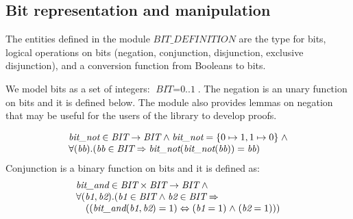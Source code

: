 \documentclass[a4paper]{llncs}
\begin{document}
\subsection{Bit representation and manipulation}
\label{subsec:HardwareLibrary1}

The entities defined in the module $\textit{BIT\_DEFINITION}$ are the
type for bits, logical operations on bits (negation, conjunction,
disjunction, exclusive disjunction), and a conversion function from
Booleans to bits.

We model bits as a set of integers: $\textit{BIT} =
\textit{0..1}$. The negation is an unary function on bits and it is
defined below. The module also provides lemmas on negation that may be useful for the
users of the library to develop proofs.

$$
\begin{array}{l}
\textit{bit\_not}  \in  \textit{BIT}  \fun  \textit{BIT}  \land 
\textit{bit\_not} \rm = \rm \{ \rm 0  \mapsto  \rm 1 , \rm 1  \mapsto  \rm 0 \rm \} \land \\
\forall (\textit{bb}).(\textit{bb} \in \textit{BIT} \implies \textit{bit\_not}(\textit{bit\_not}(\textit{bb})) = \textit{bb})
\end{array}
$$
Conjunction is a binary function on bits and it is defined as:
$$
\begin{array}{l}
\textit{bit\_and} \in \textit{BIT} \times \textit{BIT} \fun \textit{BIT} \land \\
\forall (\textit{b1}, \textit{b2}).(\textit{b1}  \in \textit{BIT}  \land \textit{b2} \in \textit{BIT} \implies \\
\quad ((\textit{bit\_and}(\textit{b1}, \textit{b2}) = 1) \iff (\textit{b1} = 1)  \land  (\textit{b2} = 1)))
\end{array}
$$
\end{document}
